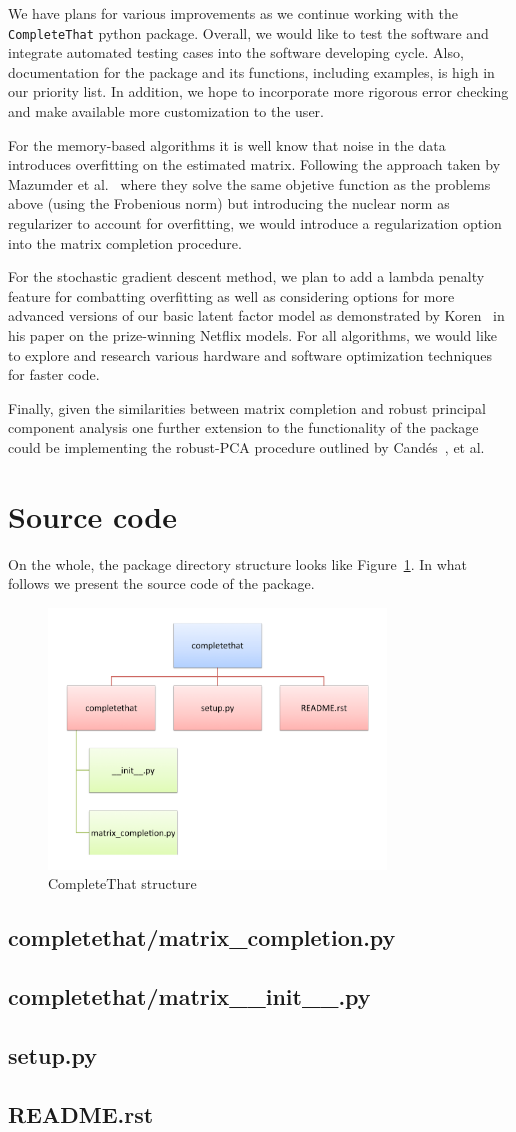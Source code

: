 \documentclass[12pt]{article}
\newcommand{\code}[2] {
  \hrulefill
  \subsection*{#1}
  
  \vspace{2em}
}
\begin{document}
We have plans for various improvements as we continue working with the \texttt{CompleteThat} python package. Overall, we would like to test the software and integrate automated testing cases into the software developing cycle. Also, documentation for the package and its functions, including examples, is high in our priority list. In addition, we hope to incorporate more rigorous error checking and make   available more customization to the user. 

For the memory-based algorithms it is well know that noise in the data introduces overfitting on the estimated matrix. Following the approach taken by Mazumder et al.~\cite{mazumder:2010}  where they solve the same objetive function as the problems above (using the Frobenious norm) but introducing the nuclear norm as regularizer to account for overfitting, we would introduce a regularization option into the matrix completion procedure. 

For the stochastic gradient descent method, we plan to add a lambda penalty feature for combatting overfitting as well as considering options for more advanced versions of our basic latent factor model as demonstrated by Koren~\cite{koren:2008} in his paper on the prize-winning Netflix models. 
For all algorithms, we would like to explore and research various hardware and software optimization techniques for faster code. 

Finally, given the similarities between matrix completion and robust principal component analysis one further extension to the functionality of the package could be implementing the robust-PCA procedure outlined by Cand\'es~\cite{candes:2011}, et al.

\newpage



\newpage
\section{Source code}
On the whole, the package directory structure looks like Figure~\ref{fig:code_scheme}. In what follows we present the source code of the package.
\begin{figure}[h!]
  \centering
    \includegraphics[width=0.8\textwidth]{./figures/code_scheme.pdf}
    \caption{CompleteThat structure}
    \label{fig:code_scheme}
\end{figure}

\code{completethat/matrix\_completion.py}{../code/completethat/matrix_completion.py}
\code{completethat/matrix\_\_init\_\_.py}{../code/completethat/__init__.py}
\code{setup.py}{../code/setup.py}
\hrulefill
\subsection*{README.rst}

\end{document}

